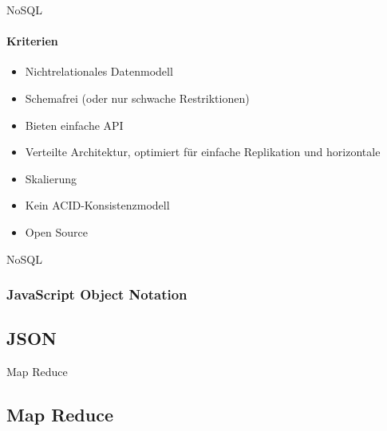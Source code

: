 \documentclass[11pt]{beamer}
\begin{document}
\begin{frame}{NoSQL}
\framesubtitle{Kriterien}
\begin{itemize}
\item Nichtrelationales Datenmodell
\item Schemafrei (oder nur schwache Restriktionen)
\item Bieten einfache API
\item Verteilte Architektur, optimiert für einfache Replikation und horizontale \item Skalierung
\item Kein ACID-Konsistenzmodell
\item Open Source
\end{itemize}
\end{frame}

\begin{frame}{NoSQL}
\begin{figure}
\end{figure}
\end{frame}

\begin{frame}[fragile]
\frametitle{JavaScript Object Notation}
\subsection{JSON}

\end{frame}

\begin{frame}{Map Reduce}
\subsection{Map Reduce}
\begin{figure}
\end{figure}
\end{frame}
\end{document}
